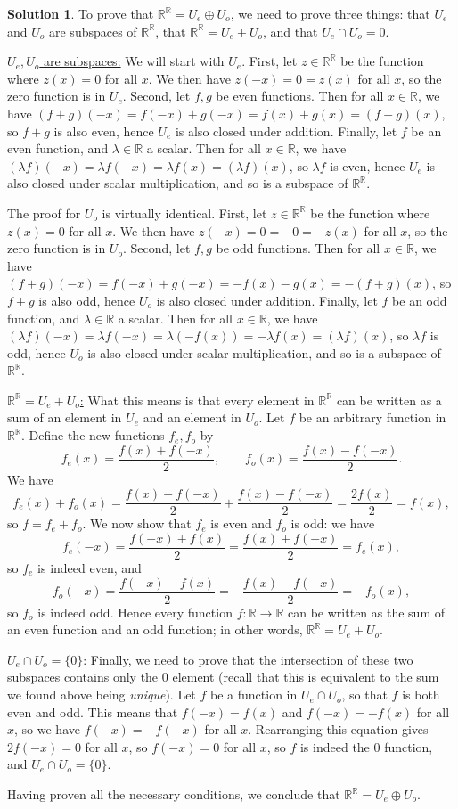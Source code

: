 \documentclass[12pt]{article}
\theoremstyle{definition}
\theoremstyle{definition}
\newtheorem*{soln}{Solution}
\newcommand{\R}{\mathbb{R}}
\begin{document}
\begin{soln}
To prove that $\R^\R=U_e\oplus U_o$, we need to prove three things: that $U_e$ and $U_o$ are subspaces of $\R^\R$, that $\R^\R=U_e+U_o$, and that $U_e\cap U_o=0$.
 
\underline{$U_e,U_o$ are subspaces:} We will start with $U_e$. First, let $z\in \R^\R$ be the function where $z(x)=0$ for all $x$. We then have $z(-x)=0=z(x)$ for all $x$, so the zero function is in $U_e$. Second, let $f,g$ be even functions. Then for all $x\in\R$, we have $(f+g)(-x)=f(-x)+g(-x)=f(x)+g(x)=(f+g)(x)$, so $f+g$ is also even, hence $U_e$ is also closed under addition. Finally, let $f$ be an even function, and $\lambda\in \R$ a scalar. Then for all $x\in\R$, we have $(\lambda f)(-x)=\lambda f(-x)=\lambda f(x) = (\lambda f)(x)$, so $\lambda f$ is even, hence $U_e$ is also closed under scalar multiplication, and so is a subspace of $\R^\R$.

The proof for $U_o$ is virtually identical. First, let $z\in \R^\R$ be the function where $z(x)=0$ for all $x$. We then have $z(-x)=0=-0=-z(x)$ for all $x$, so the zero function is in $U_o$. Second, let $f,g$ be odd functions. Then for all $x\in\R$, we have $(f+g)(-x)=f(-x)+g(-x)=-f(x)-g(x)=-(f+g)(x)$, so $f+g$ is also odd, hence $U_o$ is also closed under addition. Finally, let $f$ be an odd function, and $\lambda\in \R$ a scalar. Then for all $x\in\R$, we have $(\lambda f)(-x)=\lambda f(-x)=\lambda (-f(x)) = -\lambda f(x)=(\lambda f)(x)$, so $\lambda f$ is odd, hence $U_o$ is also closed under scalar multiplication, and so is a subspace of $\R^\R$.

\underline{$\R^\R=U_e+U_o$:} What this means is that every element in $\R^\R$ can be written as a sum of an element in $U_e$ and an element in $U_o$. Let $f$ be an arbitrary function in $\R^\R$. Define the new functions $f_e,f_o$ by
\[f_e(x) = \frac{f(x)+f(-x)}{2}, \qquad f_o(x) = \frac{f(x)-f(-x)}{2}.\]
We have
\[f_e(x)+f_o(x) = \frac{f(x)+f(-x)}{2} + \frac{f(x)-f(-x)}{2} = \frac{2f(x)}{2} = f(x),\]
so $f=f_e+f_o$. We now show that $f_e$ is even and $f_o$ is odd: we have
\[f_e(-x)= \frac{f(-x)+f(x)}{2} = \frac{f(x)+f(-x)}{2} = f_e(x),\]
so $f_e$ is indeed even, and 
\[f_o(-x) = \frac{f(-x)-f(x)}{2} = -\frac{f(x)-f(-x)}{2} = -f_o(x),\]
so $f_o$ is indeed odd. Hence every function $f:\R\to\R$ can be written as the sum of an even function and an odd function; in other words, $\R^\R=U_e+U_o$.

\underline{$U_e\cap U_o=\{0\}$:} Finally, we need to prove that the intersection of these two subspaces contains only the $0$ element (recall that this is equivalent to the sum we found above being \emph{unique}). Let $f$ be a function in $U_e\cap U_o$, so that $f$ is both even and odd. This means that $f(-x)=f(x)$ and $f(-x)=-f(x)$ for all $x$, so we have $f(-x)=-f(-x)$ for all $x$. Rearranging this equation gives $2f(-x)=0$ for all $x$, so $f(-x)=0$ for all $x$, so $f$ is indeed the $0$ function, and $U_e\cap U_o=\{0\}$.

Having proven all the necessary conditions, we conclude that $\R^\R=U_e\oplus U_o$.
\end{soln}
\end{document}
